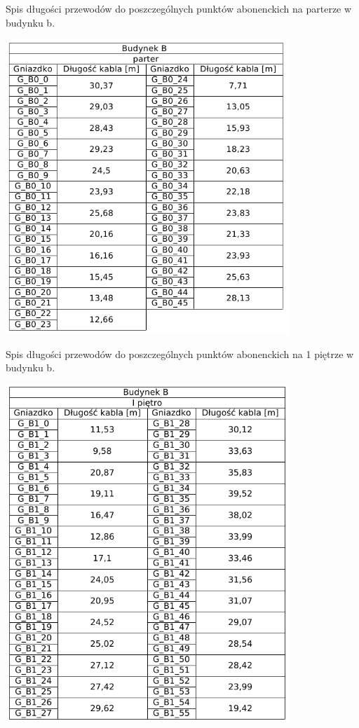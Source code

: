 \documentclass{report}
\begin{document}
\begin{table}[H]
\caption{Spis długości przewodów do poszczególnych punktów abonenckich na parterze w budynku b.}
 \centering
      \includegraphics[width=0.8\textwidth]{./obrazki/dl_kable/b0.png}
\end{table}

\begin{table}[H]
\caption{Spis długości przewodów do poszczególnych punktów abonenckich na 1 piętrze w budynku b.}
 \centering
      \includegraphics[width=0.8\textwidth]{./obrazki/dl_kable/b1.png}
\end{table}
\end{document}
